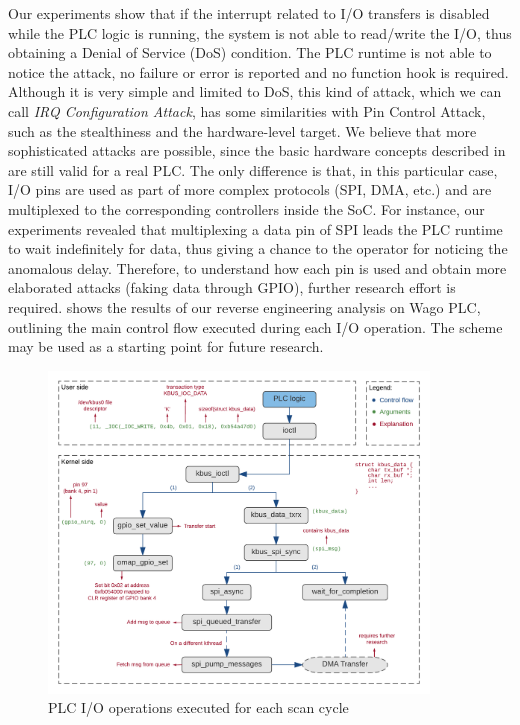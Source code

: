 Our experiments show that if the interrupt related to I/O transfers is disabled while the PLC logic is running, the system is not able to read/write the I/O,
thus obtaining a Denial of Service (DoS) condition. The PLC runtime is not able to notice the attack, no failure or error is reported and no function hook is required.
Although it is very simple and limited to DoS, this kind of attack, which we can call \emph{IRQ Configuration Attack}, has some similarities with Pin Control Attack,
such as the stealthiness and the hardware-level target.
We believe that more sophisticated attacks are possible, since the basic hardware concepts described in 
are still valid for a real PLC. The only difference is that, in this particular case, I/O pins are used as part of more complex protocols (SPI, DMA, etc.) and
are multiplexed to the corresponding controllers inside the SoC.
For instance, our experiments revealed that multiplexing a data pin of SPI leads the PLC runtime to wait indefinitely for data, thus giving a chance to the operator
for noticing the anomalous delay. Therefore, to understand how each pin is used and obtain more elaborated attacks (\eg faking data through GPIO),
further research effort is required.
 shows the results of our reverse engineering analysis on Wago PLC, outlining the main control flow executed during each I/O operation.
The scheme may be used as a starting point for future research.
\begin{figure}[h]
\centerline{\includegraphics[width=0.9\textwidth]{res/plc_io}}
\caption{PLC I/O operations executed for each scan cycle \label{fig:plc_io}}
\end{figure}

